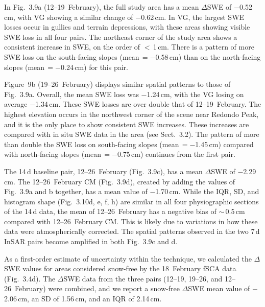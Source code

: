 In Fig.~3.9a (12--19~February), the full study area has a mean $\Delta$SWE of $-$0.52\,cm, with VG showing a similar change of $-$0.62\,cm. In VG, the largest SWE losses occur in gullies and terrain depressions, with these areas showing visible SWE loss in all four pairs. The northeast corner of the study area shows a consistent increase in SWE, on the order of $<$\,1\,cm. There is a pattern of more SWE loss on the south-facing slopes (mean\,$ = -0$.58\,cm) than on the north-facing slopes (mean\,$= -0$.24\,cm) for this pair.

Figure~9b (19--26~February) displays similar spatial patterns to those of Fig.~3.9a. Overall, the mean SWE loss was $-$1.24\,cm, with the VG losing on average $-$1.34\,cm. These SWE losses are over double that of 12--19~February. The highest elevation occurs in the northwest corner of the scene near Redondo Peak, and it is the only place to show consistent SWE increases. These increases are compared with in situ SWE data in the area (see Sect.~3.2). The pattern of more than double the SWE loss on south-facing slopes (mean\,$= -$1.45\,cm) compared with north-facing slopes (mean\,$= -$0.75\,cm) continues from the first pair.

The 14\,d baseline pair, 12--26~February (Fig.~3.9c), has a mean $\Delta$SWE of $-$2.29\,cm. The 12--26~February CM (Fig.~3.9d), created by adding the values of Fig.~3.9a and b together, has a mean value of $-$1.70\,cm. While the IQR, SD, and histogram shape (Fig.~3.10d, e, f, h) are similar in all four physiographic sections of the 14\,d data, the mean of 12--26~February has a negative bias of $\sim$\,0.5\,cm compared with 12--26~February CM. This is likely due to variations in how these data were atmospherically corrected. The spatial patterns observed in the two 7\,d InSAR pairs become amplified in both Fig.~3.9c and d.

As a first-order estimate of uncertainty within the technique, we calculated the $\Delta$SWE values for areas considered snow-free by the 18~February fSCA data (Fig.~3.4d). The $\Delta$SWE data from the three pairs (12--19, 19--26, and 12--26~February) were combined, and we report a snow-free $\Delta$SWE mean value of $-$2.06\,cm, an SD of 1.56\,cm, and an IQR of 2.14\,cm.


